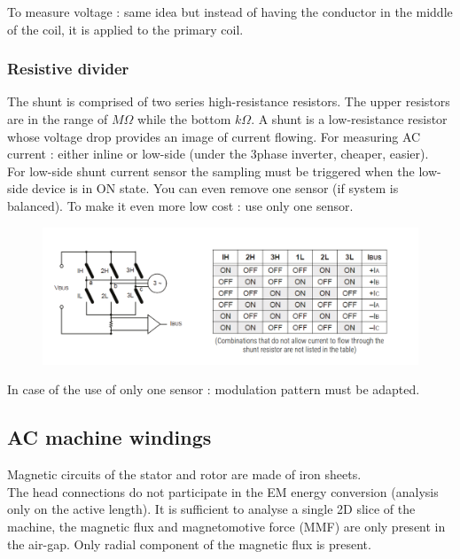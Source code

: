 \documentclass[../main.tex]{subfiles}
\begin{document}
To measure voltage : same idea but instead of having the conductor in the middle of the coil, it is applied to the primary coil. 

\subsubsection{Resistive divider}
The shunt is comprised of two series high-resistance resistors. The upper resistors are in the range of $M\Omega$ while the bottom $k\Omega$. A shunt is a low-resistance resistor whose voltage drop provides an image of current flowing. For measuring AC current : either inline or low-side (under the 3phase inverter, cheaper, easier).\\
For low-side shunt current sensor the sampling must be triggered when the low-side device is in ON state. You can even remove one sensor (if system is balanced). To make it even more low cost : use only one sensor.\\

\begin{figure}[hbt!]
    \centering
    \includegraphics[width=0.8\linewidth]{IMAGES/Indus_el/Screenshot from 2025-03-10 17-36-37.png}
\end{figure}

\warning In case of the use of only one sensor : modulation pattern must be adapted.


\subsection{AC machine windings}
Magnetic circuits of the stator and rotor are made of iron sheets. \\
The head connections do not participate in the EM energy conversion (analysis only on the active length). It is sufficient to analyse a single 2D slice of the machine, the magnetic flux and magnetomotive force (MMF) are only present in the air-gap. Only radial component of the magnetic flux is present. \\
\end{document}
